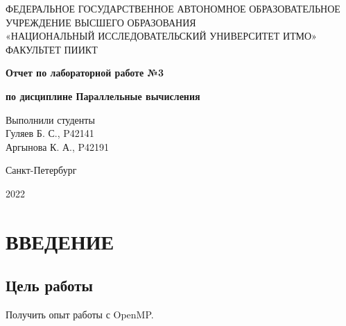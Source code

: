 \documentclass[14pt, a4paper, oneside, final]{extarticle}
\begin{document}
 
\setcounter{page}{0}
\begin{center} 
\small
\footnotesize{ФЕДЕРАЛЬНОЕ ГОСУДАРСТВЕННОЕ АВТОНОМНОЕ ОБРАЗОВАТЕЛЬНОЕ}\\
\footnotesize{УЧРЕЖДЕНИЕ ВЫСШЕГО ОБРАЗОВАНИЯ}\\ 
\footnotesize{«НАЦИОНАЛЬНЫЙ ИССЛЕДОВАТЕЛЬСКИЙ УНИВЕРСИТЕТ ИТМО»}\\
\hfill \break 
\footnotesize{ФАКУЛЬТЕТ ПИИКТ}\\
\hfill \break
\hfill \break 
\hfill \break
\large{
    \textbf{Отчет по лабораторной работе №3}

    \textbf{по дисциплине Параллельные вычисления}
}

\hfill \break 
\end{center} 
\begin{flushright} 
Выполнили студенты\\
Гуляев Б. С., P42141\\
Аргынова К. А., P42191\\
\end{flushright}
\vspace*{\fill}
\begin{center}
Санкт-Петербург

2022
\end{center}
\normalsize
\thispagestyle{empty} 
\clearpage
\def\contentsname{ОГЛАВЛЕНИЕ}
\tableofcontents 

\clearpage
\section*{ВВЕДЕНИЕ}
\subsection*{Цель работы}
Получить опыт работы с OpenMP.
\end{document}
